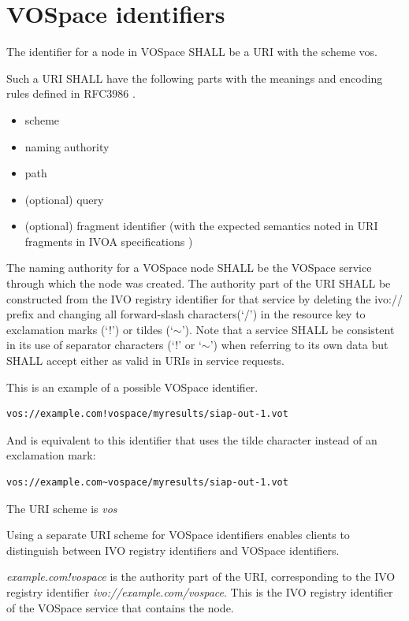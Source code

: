 \documentclass[11pt,a4paper]{ivoa}
\begin{document}
\section{VOSpace identifiers}
\label{sec:vospace identifiers}
The identifier for a node in VOSpace SHALL be a URI with the scheme vos.

Such a URI SHALL have the following parts with the meanings and encoding rules defined in RFC3986 \citep{std:RFC3986}.

\begin{itemize}
  \item scheme
  \item naming authority
  \item path
  \item (optional) query
  \item (optional) fragment identifier (with the expected semantics noted in URI fragments in IVOA specifications \citep{note:uriforms})
\end{itemize}

The naming authority for a VOSpace node SHALL be the VOSpace service through which the node was created. The authority part of the URI SHALL be constructed from the IVO registry identifier \citep{std:VOID2} for that service by deleting the ivo:// prefix and changing all forward-slash characters(`/') in the resource key to exclamation marks (`!') or tildes (`$\mathtt{\sim}$'). Note that a service SHALL be consistent in its use of separator characters (`!' or `$\mathtt{\sim}$') when referring to its own data but SHALL accept either as valid in URIs in service requests.

This is an example of a possible VOSpace identifier.

\begin{verbatim}
vos://example.com!vospace/myresults/siap-out-1.vot
\end{verbatim}

And is equivalent to this identifier that uses the tilde character instead of an exclamation mark:

\begin{verbatim}
vos://example.com~vospace/myresults/siap-out-1.vot
\end{verbatim}

The URI scheme is \emph{vos}

Using a separate URI scheme for VOSpace identifiers enables clients to distinguish between IVO registry identifiers and VOSpace identifiers.

\emph{example.com!vospace} is the authority part of the URI, corresponding to the IVO registry identifier \emph{ivo://example.com/vospace}.  This is the IVO registry identifier of the VOSpace service that contains the node.
\end{document}
